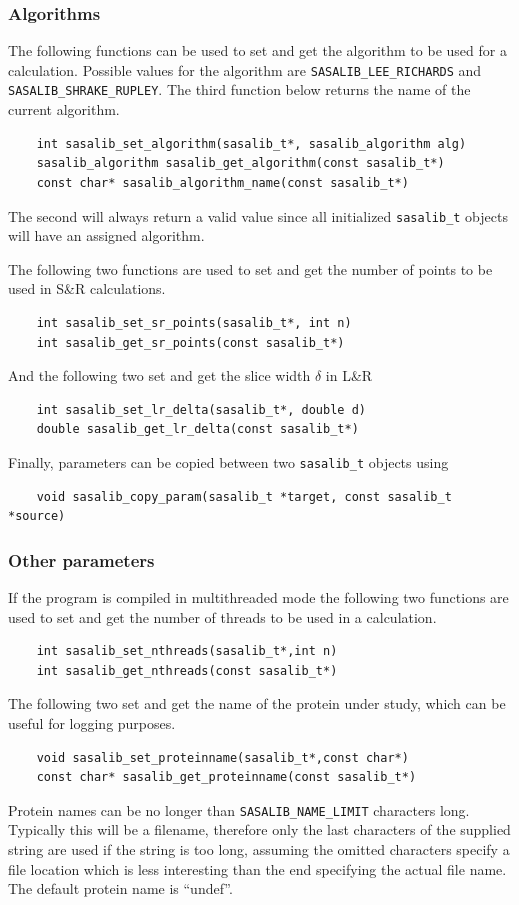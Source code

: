 \documentclass[a4paper,11pt]{article}
\begin{document}
\subsubsection{Algorithms}

The following functions can be used to set and get the algorithm to be
used for a calculation. Possible values for the algorithm are
\verb|SASALIB_LEE_RICHARDS| and \verb|SASALIB_SHRAKE_RUPLEY|.  The
third function below returns the name of
the current algorithm.
\begin{verbatim}
    int sasalib_set_algorithm(sasalib_t*, sasalib_algorithm alg)
    sasalib_algorithm sasalib_get_algorithm(const sasalib_t*)
    const char* sasalib_algorithm_name(const sasalib_t*)
\end{verbatim}
The second will always return a valid value since all initialized
\verb|sasalib_t| objects will have an assigned algorithm.

The following two functions are used to set and get the number of
points to be used in S\&R calculations. 
\begin{verbatim}
    int sasalib_set_sr_points(sasalib_t*, int n)
    int sasalib_get_sr_points(const sasalib_t*)
\end{verbatim}
And the following two set and get the slice width $\delta$ in L\&R
\begin{verbatim}
    int sasalib_set_lr_delta(sasalib_t*, double d) 
    double sasalib_get_lr_delta(const sasalib_t*)
\end{verbatim}
Finally, parameters can be copied between two \verb|sasalib_t| objects
using
\begin{verbatim}
    void sasalib_copy_param(sasalib_t *target, const sasalib_t *source)
\end{verbatim}

\subsubsection{Other parameters}
If the program is compiled in multithreaded mode the following two
functions are used to set and get the number of threads to be used in
a calculation.
\begin{verbatim}
    int sasalib_set_nthreads(sasalib_t*,int n)
    int sasalib_get_nthreads(const sasalib_t*)
\end{verbatim}
The following two set and get the name of the protein under study,
which can be useful for logging purposes.
\begin{verbatim}
    void sasalib_set_proteinname(sasalib_t*,const char*)
    const char* sasalib_get_proteinname(const sasalib_t*)
\end{verbatim}
Protein names can be no longer than \verb|SASALIB_NAME_LIMIT|
characters long. Typically this will be a filename, therefore only the
last characters of the supplied string are used if the string is too
long, assuming the omitted characters specify a file location which is
less interesting than the end specifying the actual file name. The default 
protein name is ``undef''.
\end{document}
